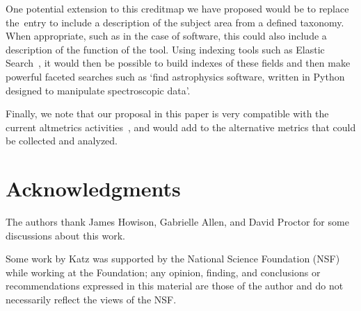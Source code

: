 \documentclass[a4paper,10pt]{article}
\begin{document}
One potential extension to this creditmap we have proposed would be to replace the~\keywords entry to include a description of the subject area from a defined taxonomy. When appropriate, such as in the case of software, this could also include a description of the function of the tool. Using indexing tools such as Elastic Search~\cite{elasticsearch}, it would then be possible to build indexes of these fields and then make powerful faceted searches such as `find astrophysics software, written in Python designed to manipulate spectroscopic data'.

Finally, we note that our proposal in this paper is very compatible with the current altmetrics activities~\cite{altmetrics}, and would add to the alternative metrics that could be collected and analyzed.

\section*{Acknowledgments}

The authors thank James Howison, Gabrielle Allen, and David Proctor for some discussions about this work.

Some work by Katz was supported by the National Science Foundation (NSF) while working at the Foundation; any opinion, finding, and conclusions or recommendations expressed in this material are those of the author and do not necessarily reflect the views of the NSF.



\end{document}
